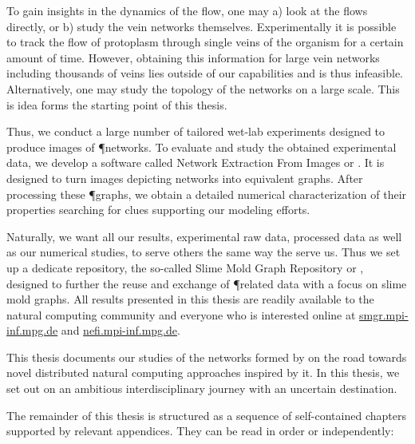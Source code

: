 	To gain insights in the dynamics of the flow, one may a) look at the flows directly, or b) study the vein networks themselves. Experimentally it is possible to track the flow of protoplasm through single veins of the organism for a certain amount of time. However, obtaining this information for large vein networks including thousands of veins lies outside of our capabilities and is thus infeasible. Alternatively, one may study the topology of the networks on a large scale. This is idea forms the starting point of this thesis. 

	Thus, we conduct a large number of tailored wet-lab experiments designed to produce images of \P networks. To evaluate and study the obtained experimental data, we develop a software called Network Extraction From Images or \NEFI. It is designed to turn images depicting networks into equivalent graphs. After processing these \P graphs, we obtain a detailed numerical characterization of their properties searching for clues supporting our modeling efforts. 

	Naturally, we want all our results, \ie experimental raw data, processed data as well as our numerical studies, to serve others the same way the serve us. Thus we set up a dedicate repository, the so-called Slime Mold Graph Repository or \SMGR, designed to further the reuse and exchange of \P related data with a focus on slime mold graphs. All results presented in this thesis are readily available to the natural computing community and everyone who is interested online at \href{http://smgr.mpi-inf.mpg.de}{smgr.mpi-inf.mpg.de} and \href{http://nefi.mpi-inf.mpg.de/}{nefi.mpi-inf.mpg.de}.

	This thesis documents our studies of the networks formed by \Pp on the road towards novel distributed natural computing approaches inspired by it. In this thesis, we set out on an ambitious interdisciplinary journey with an uncertain destination.

	The remainder of this thesis is structured as a sequence of self-contained chapters supported by relevant appendices. They can be read in order or independently:\vspace{\baselineskip}

